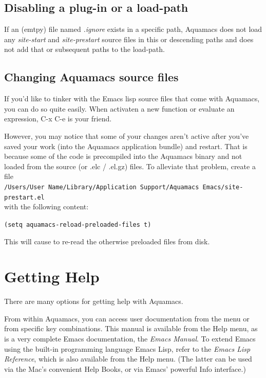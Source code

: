 \documentclass[11pt,letterpaper]{article}
\newcommand{\ttfile}{\tt}
\begin{document}
\subsection{Disabling a plug-in or a load-path}

If an (emtpy) file named \emph{.ignore} exists in a specific path, Aquamacs does not load any \emph
{site-start} and \emph{site-prestart} source files in this or descending paths and does not add that or 
subsequent paths to the load-path. 


\subsection{Changing Aquamacs source files}

If you'd like to tinker with the Emacs lisp source files that come with Aquamacs, you can do so quite easily. When activaten a new function or evaluate an expression, C-x C-e is your friend.

However, you may notice that some of your changes aren't active after you've saved your work (into the Aquamacs application bundle) and restart. That is because some of the code is precompiled into the Aquamacs binary and not loaded from the source (or .elc / .el.gz) files. To alleviate that problem, create a
file\\
{\ttfile /Users/User Name/Library/Application Support/Aquamacs Emacs/site-prestart.el} \\ with the following content:

\texttt{(setq aquamacs-reload-preloaded-files t)}

This will cause to re-read the otherwise preloaded files from disk.

\section{Getting Help}

There are many options for getting help with Aquamacs.

From within Aquamacs, you can access user documentation from the menu or from specific key combinations.  This manual is available from the Help menu, as is a very complete Emacs documentation, the \emph{Emacs Manual}.  To extend Emacs using the built-in programming language Emacs Lisp, refer to the \emph{Emacs Lisp Reference}, which is also available from the Help menu.  (The latter can be used via the Mac's convenient Help Books, or via Emacs' powerful Info interface.)
\end{document}
